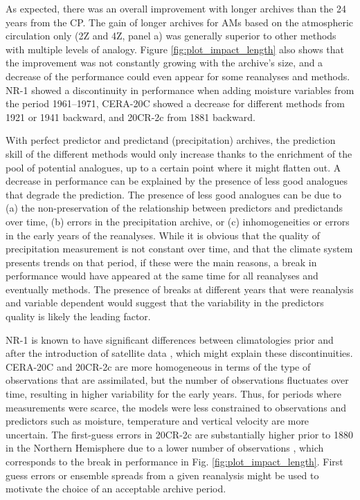 \documentclass{ametsoc}
\begin{document}
As expected, there was an overall improvement with longer archives than the 24 years from the CP. The gain of longer archives for AMs based on the atmospheric circulation only (2Z and 4Z, panel a) was generally superior to other methods with multiple levels of analogy. Figure \ref{fig:plot_impact_length} also shows that the improvement was not constantly growing with the archive's size, and a decrease of the performance could even appear for some reanalyses and methods. NR-1 showed a discontinuity in performance when adding moisture variables from the period 1961--1971, CERA-20C showed a decrease for different methods from 1921 or 1941 backward, and 20CR-2c from 1881 backward.

With perfect predictor and predictand (precipitation) archives, the prediction skill of the different methods would only increase thanks to the enrichment of the pool of potential analogues, up to a certain point where it might flatten out. A decrease in performance can be explained by the presence of less good analogues that degrade the prediction. The presence of less good analogues can be due to (a) the non-preservation of the relationship between predictors and predictands over time, (b) errors in the precipitation archive, or (c) inhomogeneities or errors in the early years of the reanalyses. While it is obvious that the quality of precipitation measurement is not constant over time, and that the climate system presents trends on that period, if these were the main reasons, a break in performance would have appeared at the same time for all reanalyses and eventually methods. The presence of breaks at different years that were reanalysis and variable dependent would suggest that the variability in the predictors quality is likely the leading factor.

NR-1 is known to have significant differences between climatologies prior and after the introduction of satellite data \citep{Kistler2001}, which might explain these discontinuities. CERA-20C and 20CR-2c are more homogeneous in terms of the type of observations that are assimilated, but the number of observations fluctuates over time, resulting in higher variability for the early years. Thus, for periods where measurements were scarce, the models were less constrained to observations and predictors such as moisture, temperature and vertical velocity are more uncertain. The first-guess errors in 20CR-2c are substantially higher prior to 1880 in the Northern Hemisphere due to a lower number of observations \citep{Compo2011}, which corresponds to the break in performance in Fig. \ref{fig:plot_impact_length}. First guess errors or ensemble spreads from a given reanalysis might be used to motivate the choice of an acceptable archive period.
\end{document}
